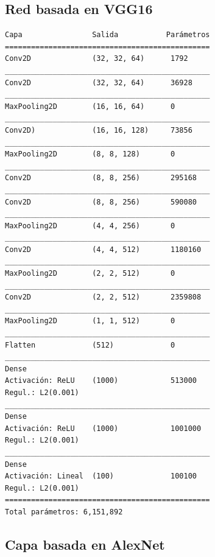 \subsection*{Red basada en VGG16}
\begin{verbatim}
Capa                Salida           Parámetros
===============================================
Conv2D              (32, 32, 64)      1792     
_______________________________________________
Conv2D              (32, 32, 64)      36928    
_______________________________________________
MaxPooling2D        (16, 16, 64)      0        
_______________________________________________
Conv2D)             (16, 16, 128)     73856    
_______________________________________________
MaxPooling2D        (8, 8, 128)       0        
_______________________________________________
Conv2D              (8, 8, 256)       295168   
_______________________________________________
Conv2D              (8, 8, 256)       590080   
_______________________________________________
MaxPooling2D        (4, 4, 256)       0        
_______________________________________________
Conv2D              (4, 4, 512)       1180160  
_______________________________________________
MaxPooling2D        (2, 2, 512)       0        
_______________________________________________
Conv2D              (2, 2, 512)       2359808  
_______________________________________________
MaxPooling2D        (1, 1, 512)       0        
_______________________________________________
Flatten             (512)             0        
_______________________________________________
Dense                                          
Activación: ReLU    (1000)            513000   
Regul.: L2(0.001)
_______________________________________________
Dense                                          
Activación: ReLU    (1000)            1001000  
Regul.: L2(0.001)
_______________________________________________
Dense                                          
Activación: Lineal  (100)             100100   
Regul.: L2(0.001)
===============================================
Total parámetros: 6,151,892
\end{verbatim}

\subsection*{Capa basada en AlexNet}

